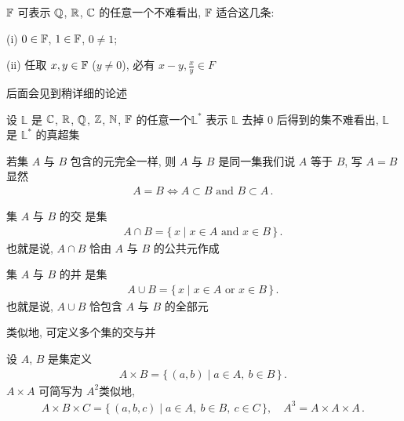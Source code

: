 \begin{definition}
    $\mathbb{F}$  可表示 $\mathbb{Q}$, $\mathbb{R}$, $\mathbb{C}$ 的任意一个\period 不难看出, $\mathbb{F}$ 适合这几条:

    (i) $0 \in \mathbb{F}$, $1 \in \mathbb{F}$, $0 \neq 1$;

    (ii) 任取 $x,y \in \mathbb{F}$ ($y \neq 0$), 必有 $x-y, \frac{x}{y} \in F$\period

    后面会见到稍详细的论述\period
\end{definition}

\begin{definition}
    设 $\mathbb{L}$ 是 $\mathbb{C}$, $\mathbb{R}$, $\mathbb{Q}$, $\mathbb{Z}$, $\mathbb{N}$, $\mathbb{F}$ 的任意一个\period $\mathbb{L}^{\ast}$ 表示 $\mathbb{L}$ 去掉 $0$ 后得到的集\period 不难看出, $\mathbb{L}$ 是 $\mathbb{L}^{\ast}$ 的真超集\period
\end{definition}

\begin{definition}
    若集 $A$ 与 $B$ 包含的元完全一样, 则 $A$ 与 $B$ 是同一集\period 我们说 $A$ 等于 $B$, 写 $A = B$\period 显然
    \begin{align*}
        A = B \iff A \subset B \text{ and } B \subset A \period
    \end{align*}
\end{definition}

\begin{definition}
    集 $A$ 与 $B$ 的交  是集
    \begin{align*}
        A \cap B = \{\, x \mid x \in A \text{ and } x \in B \,\} \period
    \end{align*}
    也就是说, $A \cap B$ 恰由 $A$ 与 $B$ 的公共元作成\period

    集 $A$ 与 $B$ 的并  是集
    \begin{align*}
        A \cup B = \{\, x \mid x \in A \text{ or } x \in B \,\} \period
    \end{align*}
    也就是说, $A \cup B$ 恰包含 $A$ 与 $B$ 的全部元\period

    类似地, 可定义多个集的交与并\period
\end{definition}

\begin{definition}
    设 $A$, $B$ 是集\period 定义
    \begin{align*}
        A \times B = \{\, (a,b) \mid a \in A, \ b \in B  \,\} \period
    \end{align*}
    $A \times A$ 可简写为 $A^2$\period 类似地,
    \begin{align*}
        A \times B \times C = \{\, (a,b,c) \mid a \in A, \ b \in B, \ c \in C  \,\}, \quad A^3 = A \times A \times A \period
    \end{align*}
\end{definition}

